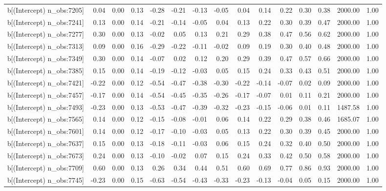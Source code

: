 \begin{table}[ht]
\begin{tabular}{rrrrrrrrrrrrrrr}
  b[(Intercept) n\_obs:7205] & 0.04 & 0.00 & 0.13 & -0.28 & -0.21 & -0.13 & -0.05 & 0.04 & 0.14 & 0.22 & 0.30 & 0.38 & 2000.00 & 1.00 \\ 
  b[(Intercept) n\_obs:7241] & 0.13 & 0.00 & 0.14 & -0.21 & -0.14 & -0.05 & 0.04 & 0.13 & 0.22 & 0.30 & 0.39 & 0.47 & 2000.00 & 1.00 \\ 
  b[(Intercept) n\_obs:7277] & 0.30 & 0.00 & 0.13 & -0.02 & 0.05 & 0.13 & 0.21 & 0.29 & 0.38 & 0.47 & 0.56 & 0.62 & 2000.00 & 1.00 \\ 
  b[(Intercept) n\_obs:7313] & 0.09 & 0.00 & 0.16 & -0.29 & -0.22 & -0.11 & -0.02 & 0.09 & 0.19 & 0.30 & 0.40 & 0.48 & 2000.00 & 1.00 \\ 
  b[(Intercept) n\_obs:7349] & 0.30 & 0.00 & 0.14 & -0.07 & 0.02 & 0.12 & 0.20 & 0.29 & 0.39 & 0.47 & 0.57 & 0.66 & 2000.00 & 1.00 \\ 
  b[(Intercept) n\_obs:7385] & 0.15 & 0.00 & 0.14 & -0.19 & -0.12 & -0.03 & 0.05 & 0.15 & 0.24 & 0.33 & 0.43 & 0.51 & 2000.00 & 1.00 \\ 
  b[(Intercept) n\_obs:7421] & -0.22 & 0.00 & 0.12 & -0.54 & -0.47 & -0.38 & -0.30 & -0.22 & -0.14 & -0.07 & 0.02 & 0.09 & 2000.00 & 1.00 \\ 
  b[(Intercept) n\_obs:7457] & -0.17 & 0.00 & 0.14 & -0.54 & -0.45 & -0.35 & -0.26 & -0.17 & -0.07 & 0.01 & 0.11 & 0.21 & 2000.00 & 1.00 \\ 
  b[(Intercept) n\_obs:7493] & -0.23 & 0.00 & 0.13 & -0.53 & -0.47 & -0.39 & -0.32 & -0.23 & -0.15 & -0.06 & 0.01 & 0.11 & 1487.58 & 1.00 \\ 
  b[(Intercept) n\_obs:7565] & 0.14 & 0.00 & 0.12 & -0.15 & -0.08 & -0.01 & 0.06 & 0.14 & 0.22 & 0.29 & 0.38 & 0.46 & 1685.07 & 1.00 \\ 
  b[(Intercept) n\_obs:7601] & 0.14 & 0.00 & 0.12 & -0.17 & -0.10 & -0.03 & 0.05 & 0.13 & 0.22 & 0.30 & 0.39 & 0.45 & 2000.00 & 1.00 \\ 
  b[(Intercept) n\_obs:7637] & 0.15 & 0.00 & 0.13 & -0.18 & -0.11 & -0.03 & 0.06 & 0.15 & 0.24 & 0.32 & 0.40 & 0.50 & 2000.00 & 1.00 \\ 
  b[(Intercept) n\_obs:7673] & 0.24 & 0.00 & 0.13 & -0.10 & -0.02 & 0.07 & 0.15 & 0.24 & 0.33 & 0.42 & 0.50 & 0.58 & 2000.00 & 1.00 \\ 
  b[(Intercept) n\_obs:7709] & 0.60 & 0.00 & 0.13 & 0.26 & 0.34 & 0.44 & 0.51 & 0.60 & 0.69 & 0.77 & 0.86 & 0.93 & 2000.00 & 1.00 \\ 
  b[(Intercept) n\_obs:7745] & -0.23 & 0.00 & 0.15 & -0.63 & -0.54 & -0.43 & -0.33 & -0.23 & -0.13 & -0.04 & 0.05 & 0.15 & 2000.00 & 1.00 \\ 

\end{tabular}
\end{table}
